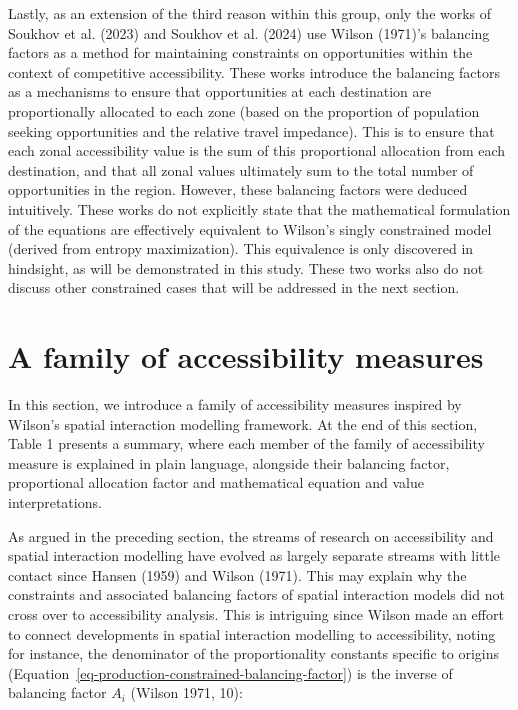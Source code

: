 \documentclass[
]{article}
\begin{document}
Lastly, as an extension of the third reason within this group, only the
works of Soukhov et al. (2023) and Soukhov et al. (2024) use Wilson
(1971)'s balancing factors as a method for maintaining constraints on
opportunities within the context of competitive accessibility. These
works introduce the balancing factors as a mechanisms to ensure that
opportunities at each destination are proportionally allocated to each
zone (based on the proportion of population seeking opportunities and
the relative travel impedance). This is to ensure that each zonal
accessibility value is the sum of this proportional allocation from each
destination, and that all zonal values ultimately sum to the total
number of opportunities in the region. However, these balancing factors
were deduced intuitively. These works do not explicitly state that the
mathematical formulation of the equations are effectively equivalent to
Wilson's singly constrained model (derived from entropy maximization).
This equivalence is only discovered in hindsight, as will be
demonstrated in this study. These two works also do not discuss other
constrained cases that will be addressed in the next section.

\section{A family of accessibility
measures}\label{a-family-of-accessibility-measures}

In this section, we introduce a family of accessibility measures
inspired by Wilson's spatial interaction modelling framework. At the end
of this section, Table 1 presents a summary, where each member of the
family of accessibility measure is explained in plain language,
alongside their balancing factor, proportional allocation factor and
mathematical equation and value interpretations.

As argued in the preceding section, the streams of research on
accessibility and spatial interaction modelling have evolved as largely
separate streams with little contact since Hansen (1959) and Wilson
(1971). This may explain why the constraints and associated balancing
factors of spatial interaction models did not cross over to
accessibility analysis. This is intriguing since Wilson made an effort
to connect developments in spatial interaction modelling to
accessibility, noting for instance, the denominator of the
proportionality constants specific to origins
(Equation~\ref{eq-production-constrained-balancing-factor}) is the
inverse of balancing factor \(A_i\) (Wilson 1971, 10):
\end{document}
